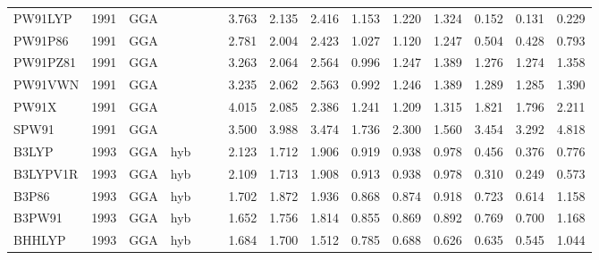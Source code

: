 \begin{landscape}
\begin{longtable}{lcccccrrrrrrrrr}
    PW91LYP          & 1991 & GGA  &          &             &           & 3.763             & 2.135             & 2.416  & 1.153              & 1.220             & 1.324  & 0.152   & 0.131 & 0.229 \\
    PW91P86          & 1991 & GGA  &          &             &           & 2.781             & 2.004             & 2.423  & 1.027              & 1.120             & 1.247  & 0.504   & 0.428 & 0.793 \\
    PW91PZ81         & 1991 & GGA  &          &             &           & 3.263             & 2.064             & 2.564  & 0.996              & 1.247             & 1.389  & 1.276   & 1.274 & 1.358 \\
    PW91VWN          & 1991 & GGA  &          &             &           & 3.235             & 2.062             & 2.563  & 0.992              & 1.246             & 1.389  & 1.289   & 1.285 & 1.390 \\
    PW91X            & 1991 & GGA  &          &             &           & 4.015             & 2.085             & 2.386  & 1.241              & 1.209             & 1.315  & 1.821   & 1.796 & 2.211 \\
    SPW91            & 1991 & GGA  &          &             &           & 3.500             & 3.988             & 3.474  & 1.736              & 2.300             & 1.560  & 3.454   & 3.292 & 4.818 \\
    B3LYP            & 1993 & GGA  & hyb      &             &           & 2.123             & 1.712             & 1.906  & 0.919              & 0.938             & 0.978  & 0.456   & 0.376 & 0.776 \\
    B3LYPV1R         & 1993 & GGA  & hyb      &             &           & 2.109             & 1.713             & 1.908  & 0.913              & 0.938             & 0.978  & 0.310   & 0.249 & 0.573 \\
    B3P86            & 1993 & GGA  & hyb      &             &           & 1.702             & 1.872             & 1.936  & 0.868              & 0.874             & 0.918  & 0.723   & 0.614 & 1.158 \\
    B3PW91           & 1993 & GGA  & hyb      &             &           & 1.652             & 1.756             & 1.814  & 0.855              & 0.869             & 0.892  & 0.769   & 0.700 & 1.168 \\
    BHHLYP           & 1993 & GGA  & hyb      &             &           & 1.684             & 1.700             & 1.512  & 0.785              & 0.688             & 0.626  & 0.635   & 0.545 & 1.044 \\

\end{longtable}
\end{landscape}
